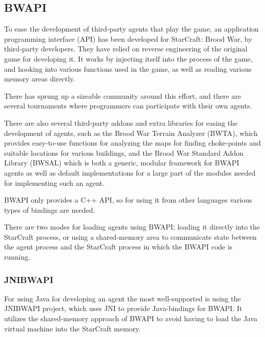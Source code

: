 \subsection{BWAPI}
To ease the development of third-party agents that play the game, an application programming interface (API) has been developed for StarCraft: Brood War, by third-party developers. They have relied on reverse engineering of the original game for developing it. It works by injecting itself into the process of the game, and hooking into various functions used in the game, as well as reading various memory areas directly.\cite{bwapi}

There has sprung up a sizeable community around this effort, and there are several tournaments where programmers can participate with their own agents.\cite{bwapi}

There are also several third-party addons and extra libraries for easing the development of agents, such as the Brood War Terrain Analyzer (BWTA), which provides easy-to-use functions for analyzing the maps for finding choke-points and suitable locations for various buildings,\cite{bwta} and the Brood War Standard Addon Library (BWSAL) which is both a generic, modular framework for BWAPI agents as well as default implementations for a large part of the modules needed for implementing such an agent.\cite{bwsal}

BWAPI only provides a C++ API, so for using it from other languages various types of bindings are needed.

There are two modes for loading agents using BWAPI; loading it directly into the StarCraft process, or using a shared-memory area to communicate state between the agent process and the StarCraft process in which the BWAPI code is running.\cite{bwapi}

\subsubsection{JNIBWAPI}
For using Java for developing an agent the most well-supported is using the JNIBWAPI project, which uses JNI to provide Java-bindings for BWAPI. It utilizes the shared-memory approach of BWAPI to avoid having to load the Java virtual machine into the StarCraft memory.
